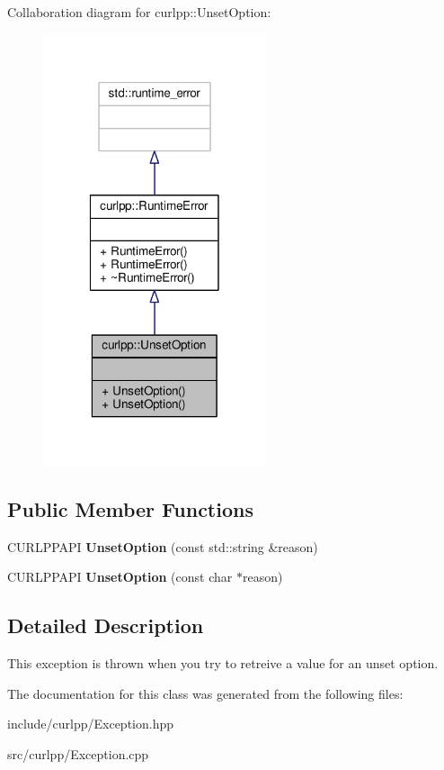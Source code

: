 Collaboration diagram for curlpp\-:\-:Unset\-Option\-:\nopagebreak
\begin{figure}[H]
\begin{center}
\leavevmode
\includegraphics[width=186pt]{classcurlpp_1_1UnsetOption__coll__graph}
\end{center}
\end{figure}
\subsection*{Public Member Functions}
\begin{DoxyCompactItemize}
\item 
\hypertarget{classcurlpp_1_1UnsetOption_a086177461e4721c8252c888078b50e18}{C\-U\-R\-L\-P\-P\-A\-P\-I {\bfseries Unset\-Option} (const std\-::string \&reason)}\label{classcurlpp_1_1UnsetOption_a086177461e4721c8252c888078b50e18}

\item 
\hypertarget{classcurlpp_1_1UnsetOption_a23a20072c9bd1442ad4ecf907694fbe5}{C\-U\-R\-L\-P\-P\-A\-P\-I {\bfseries Unset\-Option} (const char $\ast$reason)}\label{classcurlpp_1_1UnsetOption_a23a20072c9bd1442ad4ecf907694fbe5}

\end{DoxyCompactItemize}


\subsection{Detailed Description}
This exception is thrown when you try to retreive a value for an unset option. 

The documentation for this class was generated from the following files\-:\begin{DoxyCompactItemize}
\item 
include/curlpp/Exception.\-hpp\item 
src/curlpp/Exception.\-cpp\end{DoxyCompactItemize}
